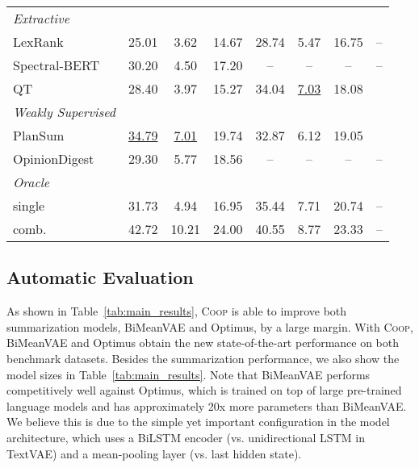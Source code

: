 \documentclass[11pt]{article}
\newcommand{\aggname}{\textsc{Coop}}
\newcommand{\name}{\mbox{\sc BiMeanVAE}}
\begin{document}
\begin{table*}[t]
\begin{tabular}{lccccccc}
\textit{Extractive}\\
\quad LexRank & 25.01 & 3.62 & 14.67 & 28.74 & 5.47 & 16.75 & -- \\
\quad Spectral-BERT & 30.20 & 4.50 & 17.20 & -- & -- & -- & --\\
\quad QT & 28.40 & 3.97 & 15.27 & 34.04 & \underline{7.03} & 18.08 \\
\midrule
\textit{Weakly Supervised}\\
\quad PlanSum & \underline{34.79} & \underline{7.01} & 19.74 & 32.87 & 6.12 & 19.05\\
\quad OpinionDigest & 29.30 & 5.77 & 18.56 & -- & -- & -- & -- \\
\midrule
\textit{Oracle}\\
\quad single & 31.73 & 4.94 & 16.95 & 35.44 & 7.71 & 20.74 & -- \\
\quad comb. & 42.72 & 10.21 & 24.00 & 40.55 & 8.77 & 23.33 & -- \\
\bottomrule
\end{tabular}
\caption{ROUGE scores on the benchmarks. Bold-faced and underlined denote the best and second-best scores respectively. \aggname{} significantly improves the performance of two summarization models, \name{} and Optimus, and achieves new state-of-the-art performance on both of the benchmark datasets.
 means the results
are copied from \citet{brazinskas-etal-2020-unsupervised},  from  \citet{amplayo2021unsupervised},  from 
\citet{wang-etal-2020-spectral},  from \citet{angelidis2021extractive}, and  from \citet{suhara-etal-2020-opiniondigest}. Note that this study classifies OpinionDigest and PlanSum as weakly-supervised summarizers since they use additional information other than review text.
}\label{tab:main_results}
\end{table*}

\subsection{Automatic Evaluation}
As shown in Table~\ref{tab:main_results}, \aggname{} is able to improve both summarization models, \name{} and Optimus, by a large margin. With \aggname{}, \name{} and Optimus obtain the new state-of-the-art performance on both benchmark datasets.
Besides the summarization performance, we also show the model sizes in Table~\ref{tab:main_results}. Note that \name{} performs competitively well against Optimus, which is trained on top of large pre-trained language models and has approximately 20x more parameters than \name. We believe this is due to the simple yet important configuration in the model architecture, which uses a BiLSTM encoder (vs. unidirectional LSTM in TextVAE) and a mean-pooling layer (vs. last hidden state).
\end{document}
